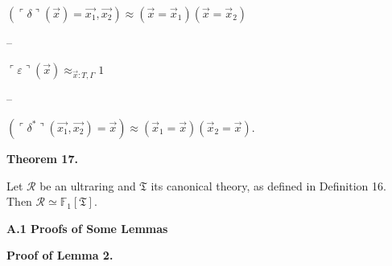 \documentclass[10pt,a4paper]{amsart}
\begin{document}
$(\ulcorner\delta\urcorner(\vec{x})=\vec{x_{1}},\vec{x_{2}})\approx(\vec{x}=%
\vec{x}_{1})(\vec{x}=\vec{x}_{2})$\par
 
 
 
\par\noindent  – 
 
$\ulcorner\varepsilon\urcorner(\vec{x})\approx_{\vec{x}:T,\Gamma}1$\par
 
 
 
\par\noindent  – 
 
$(\ulcorner\delta^{*}\urcorner(\vec{x_{1}},\vec{x_{2}})=\vec{x})\approx(\vec{x}%
_{1}=\vec{x})(\vec{x}_{2}=\vec{x})$.\par
 
 
  
 
  
 
 

 
\par\medskip\noindent\textbf{Theorem 17.}\par
 
 
Let $\mathcal{R}$ be an ultraring and $\mathfrak{T}$ its canonical theory, as defined in Definition 16. Then $\mathcal{R}\simeq\mathbb{F}_{1}[\mathfrak{T}]$.\par
 
 

 
\par\medskip\noindent\textbf{A.1 Proofs of Some Lemmas}\par
 
 
\par\medskip\noindent\textbf{Proof of Lemma 2.}\par
 
 
\end{document}
